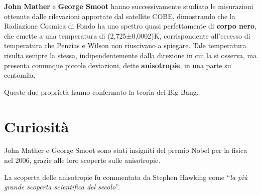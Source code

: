 \documentclass[12pt,a4paper]{article}
\begin{document}
\textbf{John Mather} e \textbf{George Smoot} hanno successivamente studiato le misurazioni ottenute dalle rilevazioni apportate dal satellite COBE, dimostrando che la Radiazione Cosmica di Fondo ha uno spettro quasi perfettamente di \textbf{corpo nero}, che emette a una temperatura di (2,725±0,0002)K, corrispondente all'eccesso di temperatura che Penzias e Wilson non riuscivano a spiegare. Tale temperatura risulta sempre la stessa, indipendentemente dalla direzione in cui la si osserva, ma presenta comunque piccole deviazioni, dette \textbf{anisotropie}, in una parte su centomila. 

Queste due proprietà hanno confermato la teoria del Big Bang.

\section*{Curiosità}
\label{curiosit}

John Mather e George Smoot sono stati insigniti del premio Nobel per la fisica nel 2006, grazie alle loro scoperte sulle anisotropie.

La scoperta delle anisotropie fu commentata da Stephen Hawking come ``\emph{la più grande scoperta scientifica del secolo}''.
\end{document}

